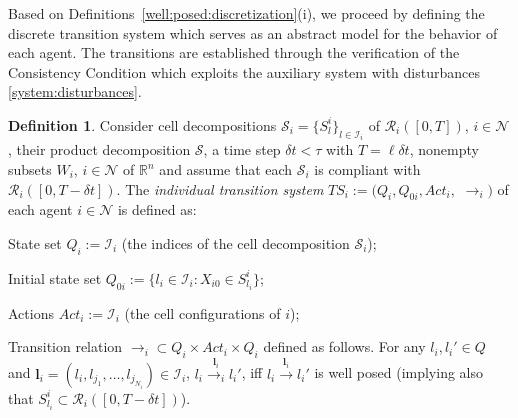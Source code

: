 \documentclass[reqno]{amsart}
\theoremstyle{plain}
\theoremstyle{definition}
\newtheorem{dfn}[thm]{Definition}
\numberwithin{equation}{section}
\begin{document}
Based on Definitions~\ref{well:posed:discretization}(i), we proceed by defining the discrete transition system which serves as an abstract model for the behavior of each agent. The transitions are established through the verification of the Consistency Condition which exploits the auxiliary system with disturbances \eqref{system:disturbances}.  

\begin{dfn} \label{individual:ts}
Consider cell decompositions ${\ensuremath{\mathcal{S}}}_i=\{S_l^i\}_{l\in{\ensuremath{\mathcal{I}}}_i}$ of ${\ensuremath{\mathcal{R}}}_i([0,T])$, $i\in{\ensuremath{\mathcal{N}}}$, their product decomposition ${\ensuremath{\mathcal{S}}}$, a time step $\delta t<\tau$ with $T=\ell\delta t$, nonempty subsets $W_i$, $i\in{\ensuremath{\mathcal{N}}}$ of ${\ensuremath{\mathbb{R}^{{n}}}}$ and assume that each ${\ensuremath{\mathcal{S}}}_i$ is compliant with  ${\ensuremath{\mathcal{R}}}_i([0,T-\delta t])$.  The \textit{individual transition system} $TS_i:=(Q_i,Q_{0i},Act_i,$ $\longrightarrow_i)$ of each agent $i\in{\ensuremath{\mathcal{N}}}$ is defined as:

\noindent \textbullet \; State set $Q_i:={\ensuremath{\mathcal{I}}}_i$ (the indices of the cell decomposition ${\ensuremath{\mathcal{S}}}_i$);

\noindent \textbullet \; Initial state set $Q_{0i}:=\{l_i\in{\ensuremath{\mathcal{I}}}_i:X_{i0}\in S_{l_i}^i\}$;

\noindent \textbullet \; Actions $Act_i:={\ensuremath{\boldsymbol{\mathcal{I}}}}_i$ (the cell configurations of $i$);

\noindent \textbullet \; Transition relation $\longrightarrow_i\subset Q_i\times Act_i\times Q_i$ defined as follows. For any $l_i,l_i'\in Q$ and ${\textbf{{l}}}_i=(l_i,l_{j_1},\ldots,l_{j_{N_i}})\in{\ensuremath{\boldsymbol{\mathcal{I}}}}_i$, $l_i\overset{{\textbf{{l}}}_i}{\longrightarrow_i}l_i'$, iff $l_i\overset{{\textbf{{l}}}_i}{\longrightarrow}l_i'$ is well posed (implying also that $S_{l_i}^i\subset{\ensuremath{\mathcal{R}}}_i([0,T-\delta t])$).
\end{dfn}
\end{document}
